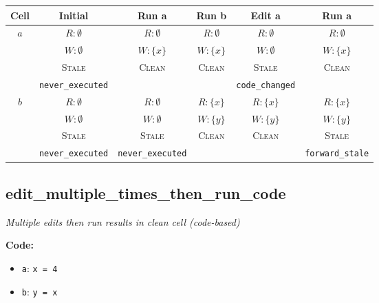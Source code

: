 \documentclass{article}
\begin{document}
\begin{center}
\small
\begin{tabular}{|c|c|c|c|c|c|}
\hline
\textbf{Cell} & \textbf{Initial} & \textbf{Run a} & \textbf{Run b} & \textbf{Edit a} & \textbf{Run a} \\
\hline
\multirow{4}{*}{$a$}
  & $R: \emptyset$ & $R: \emptyset$ & $R: \emptyset$ & $R: \emptyset$ & $R: \emptyset$ \\
  & $W: \emptyset$ & $W: \{x\}$ & $W: \{x\}$ & $W: \emptyset$ & $W: \{x\}$ \\
  & \textsc{Stale} & \textsc{Clean} & \textsc{Clean} & \textsc{Stale} & \textsc{Clean} \\
  & \footnotesize\texttt{never\_executed} &  &  & \footnotesize\texttt{code\_changed} &  \\
\hline
\multirow{4}{*}{$b$}
  & $R: \emptyset$ & $R: \emptyset$ & $R: \{x\}$ & $R: \{x\}$ & $R: \{x\}$ \\
  & $W: \emptyset$ & $W: \emptyset$ & $W: \{y\}$ & $W: \{y\}$ & $W: \{y\}$ \\
  & \textsc{Stale} & \textsc{Stale} & \textsc{Clean} & \textsc{Clean} & \textsc{Stale} \\
  & \footnotesize\texttt{never\_executed} & \footnotesize\texttt{never\_executed} &  &  & \footnotesize\texttt{forward\_stale} \\
\hline
\end{tabular}
\end{center}


\subsection{edit\_multiple\_times\_then\_run\_code}
\textit{Multiple edits then run results in clean cell (code-based)}

\textbf{Code:}
\begin{itemize}
  \item \texttt{a}: \verb|x = 4|
  \item \texttt{b}: \verb|y = x|
\end{itemize}
\end{document}
